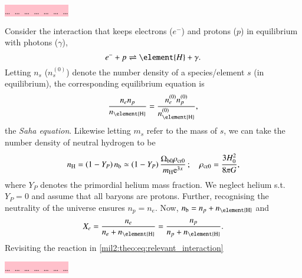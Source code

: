     \colorbox{pink}{\dots \, \dots \, \dots \, \dots \, \dots \, \dots \, \dots }

    Consider the interaction that keeps electrons ($e^{-}$) and protons ($p$) in equilibrium with photons ($\gamma$),
    \begin{equation}\label{mil2:theo:eq:relevant_interaction}
        e^{-} + p \rightleftharpoons \element{H}+\gamma.
    \end{equation}
    Letting $n_s$ ($n_s^{(0)}$) denote the number density of a species/element $s$ (in equilibrium), the corresponding equilibrium equation is 
    \begin{align}\label{mil2:theo:eq:org_Saha}
        \frac{n_e n_p}{n\ped{\element{H}}}  = \frac{n_e^{(0)} n_p^{(0)}}{n\ped{\element{H}}^{(0)}},
    \end{align}
    the \textit{Saha equation}. Likewise letting $m_s$ refer to the mass of $s$, we can take the number density of neutral hydrogen to be
    \begin{equation}
        n_\mathrm{H}= \left(1-Y_P\right) n_\mathrm{b} \simeq \left(1-Y_P\right) \frac{\Omega_\mathrm{b0}\rho_\mathrm{cr0}}{m_\mathrm{H}\mathrm{e}^{3x}}\,;\quad \rho_\mathrm{cr0} = \frac{3H_0^2}{8\pi G},
    \end{equation}
    where $Y_P$ denotes the primordial helium mass fraction. We neglect helium s.t. $Y_P = 0$ and assume that all baryons are protons. Further, recognising the neutrality of the universe ensures $n_p=n_e$. Now, $n\ped{b}=n_p + n\ped{\element{H}}$ and
    \begin{equation}
        X_e = \frac{n_e}{n_e + n\ped{\element{H}}} = \frac{n_p}{n_p + n\ped{\element{H}}}.
    \end{equation}
    Revisiting the reaction in \cref{mil2:theo:eq:relevant_interaction}

    \colorbox{pink}{\dots \, \dots \, \dots \, \dots \, \dots \, \dots \, \dots }
    
